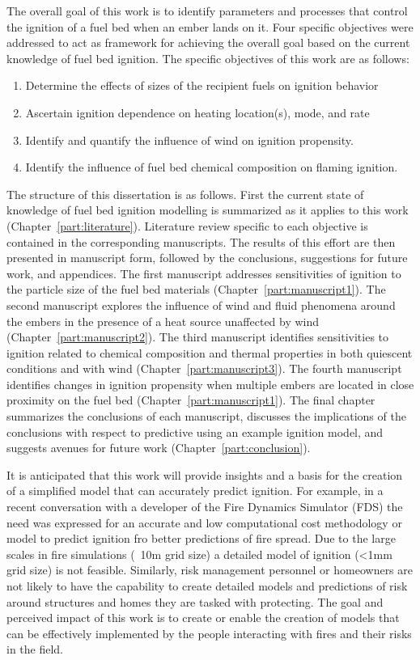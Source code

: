     The overall goal of this work is to identify parameters and processes that control the ignition of a fuel bed when an ember lands on it. Four specific objectives were addressed to act as framework for achieving the overall goal based on the current knowledge of fuel bed ignition. The specific objectives of this work are as follows:
        \begin{enumerate}
            \item Determine the effects of sizes of the recipient fuels on ignition behavior
            \item Ascertain ignition dependence on heating location(s), mode, and rate
            \item Identify and quantify the influence of wind on ignition propensity.
            \item Identify the influence of fuel bed chemical composition on flaming ignition.
        \end{enumerate}
    The structure of this dissertation is as follows. First the current state of knowledge of fuel bed ignition modelling is summarized as it applies to this work (Chapter~\ref{part:literature}). Literature review specific to each objective is contained in the corresponding manuscripts. The results of this effort are then presented in manuscript form, followed by the conclusions, suggestions for future work, and appendices. The first manuscript addresses sensitivities of ignition to the particle size of the fuel bed materials (Chapter~\ref{part:manuscript1}). The second manuscript explores the influence of wind and fluid phenomena around the embers in the presence of a heat source unaffected by wind (Chapter~\ref{part:manuscript2}). The third manuscript identifies sensitivities to ignition related to chemical composition and thermal properties in both quiescent conditions and with wind (Chapter~\ref{part:manuscript3}). The fourth manuscript identifies changes in ignition propensity when multiple embers are located in close proximity on the fuel bed (Chapter~\ref{part:manuscript1}). The final chapter summarizes the conclusions of each manuscript, discusses the implications of the conclusions with respect to predictive using an example ignition model, and suggests avenues for future work (Chapter~\ref{part:conclusion}). 
    
    It is anticipated that this work will provide insights and a basis for the creation of a simplified model that can accurately predict ignition. For example, in a recent conversation with a developer of the Fire Dynamics Simulator (FDS) the need was expressed for an accurate and low computational cost methodology or model to predict ignition fro better predictions of fire spread. Due to the large scales in fire simulations (~10\si{\meter} grid size) a detailed model of ignition (<1\si{\milli\meter} grid size) is not feasible. Similarly, risk management personnel or homeowners are not likely to have the capability to create detailed models and predictions of risk around structures and homes they are tasked with protecting. The goal and perceived impact of this work is to create or enable the creation of models that can be effectively implemented by the people interacting with fires and their risks in the field. 
